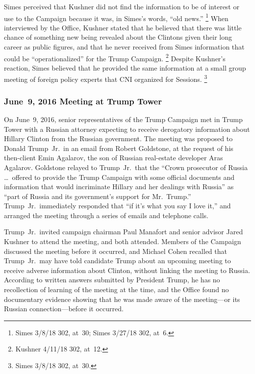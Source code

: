 Simes perceived that Kushner did not find the information to be of interest or use to the Campaign because it was, in Simes's words, ``old news.''%
\footnote{Simes 3/8/18 302, at~30;
Simes 3/27/18 302, at~6.}
When interviewed by the Office, Kushner stated that he believed that there was little chance of something new being revealed about the Clintons given their long career as public figures, and that he never received from Simes information that could be ``operationalized'' for the Trump Campaign.%
\footnote{Kushner 4/11/18 302, at~12.}
Despite Kushner's reaction, Simes believed that he provided the same information at a small group meeting of foreign policy experts that CNI organized for Sessions.%
\footnote{Simes 3/8/18 302, at~30.}

\subsubsection{June~9, 2016 Meeting at Trump Tower}

On June~9, 2016, senior representatives of the Trump Campaign met in Trump Tower with a Russian attorney expecting to receive derogatory information about Hillary Clinton from the Russian government.
The meeting was proposed to Donald Trump~Jr.\ in an email from Robert Goldstone, at the request of his then-client Emin Agalarov, the son of Russian real-estate developer Aras Agalarov.
Goldstone relayed to Trump~Jr.\ that the ``Crown prosecutor of Russia \dots\ offered to provide the Trump Campaign with some official documents and information that would incriminate Hillary and her dealings with Russia'' as ``part of Russia and its government's support for Mr.~Trump.''
Trump~Jr.\ immediately responded that ``if it's what you say I love it,'' and arranged the meeting through a series of emails and telephone calls.

Trump~Jr.\ invited campaign chairman Paul Manafort and senior advisor Jared Kushner to attend the meeting, and both attended.
Members of the Campaign discussed the meeting before it occurred, and Michael Cohen recalled that Trump~Jr.\ may have told candidate Trump about an upcoming meeting to receive adverse information about Clinton, without linking the meeting to Russia.
According to written answers submitted by President Trump, he has no recollection of learning of the meeting at the time, and the Office found no documentary evidence showing that he was made aware of the meeting---or its Russian connection---before it occurred.

